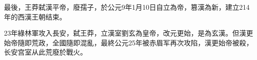最後，王莽弑漢平帝，廢孺子，於公元9年1月10日自立為帝，篡漢為新，建立214年的西漢王朝结束。

23年綠林軍攻入長安，弑王莽，立漢室劉玄為皇帝，改元更始，是為玄漢。但漢更始帝隨即荒政，全國隨即混亂，最終公元25年被赤眉军再次攻陷，漢更始帝被殺，长安宫室从此荒廢於戰火。



















